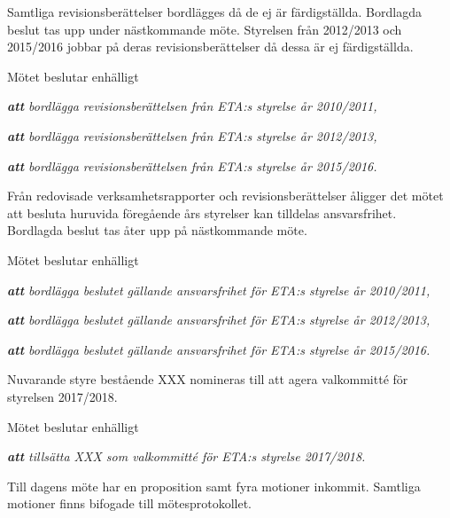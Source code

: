 \sect[Revisionsberättelse]

Samtliga revisionsberättelser bordlägges då de ej är färdigställda. Bordlagda beslut tas upp under nästkommande möte. Styrelsen från 2012/2013 och 2015/2016 jobbar på deras revisionsberättelser då dessa är ej färdigställda.


Mötet beslutar enhälligt

\emph{\textbf{att} bordlägga revisionsberättelsen från ETA:s styrelse år 2010/2011,}

\emph{\textbf{att} bordlägga revisionsberättelsen från ETA:s styrelse år 2012/2013,}

\emph{\textbf{att} bordlägga revisionsberättelsen från ETA:s styrelse år 2015/2016.}


\sect[Ansvarsfriheter]

Från redovisade verksamhetsrapporter och revisionsberättelser åligger det mötet att besluta huruvida föregående års styrelser kan tilldelas ansvarsfrihet. Bordlagda beslut tas åter upp på nästkommande möte.

Mötet beslutar enhälligt

\emph{\textbf{att} bordlägga beslutet gällande ansvarsfrihet för ETA:s styrelse år 2010/2011,}

\emph{\textbf{att} bordlägga beslutet gällande ansvarsfrihet för ETA:s styrelse år 2012/2013,}

\emph{\textbf{att} bordlägga beslutet gällande ansvarsfrihet för ETA:s styrelse år 2015/2016.}


\ssect[Auktionsresultat]






Nuvarande styre bestående XXX nomineras till att agera valkommitté för styrelsen 2017/2018.

 Mötet beslutar enhälligt
 
 \emph{\textbf{att} tillsätta XXX som valkommitté för ETA:s styrelse 2017/2018.}





\sect[Propositioner]
Till dagens möte har en proposition samt fyra motioner inkommit. Samtliga \linebreak motioner finns bifogade till mötesprotokollet.


